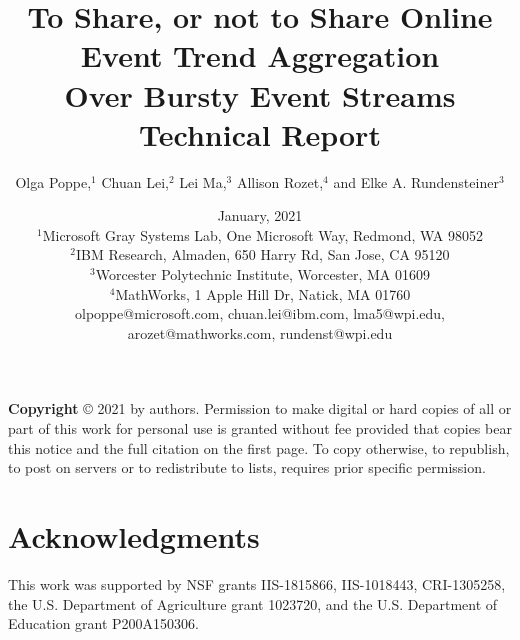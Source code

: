 \documentclass[twoside,10pt]{article} %
\title{\fontsize{15}{15}\selectfont To Share, or not to Share Online Event Trend Aggregation\\ Over Bursty Event Streams\\\vspace*{1cm}
\large Technical Report\\
\vspace*{1cm}}
\author{\large Olga Poppe,$^1$ Chuan Lei,$^2$ Lei Ma,$^3$ Allison Rozet,$^4$ and Elke A. Rundensteiner$^3$}
\date{\Large 
January, 2021\\
\vspace*{1cm}
\large $^1$Microsoft Gray Systems Lab, One Microsoft Way, Redmond, WA 98052\\
$^2$IBM Research, Almaden, 650 Harry Rd, San Jose, CA 95120\\
$^3$Worcester Polytechnic Institute, Worcester, MA 01609\\
$^4$MathWorks, 1 Apple Hill Dr, Natick, MA 01760\\
\vspace*{0.2cm}
olpoppe@microsoft.com, chuan.lei@ibm.com, lma5@wpi.edu, arozet@mathworks.com, rundenst@wpi.edu\\
\vspace*{7cm}
}
\begin{document}
\maketitle

\begin{spacing}{0.8}
{\footnotesize \noindent \textbf{Copyright} \copyright{} 2021 by
authors. Permission to make digital or hard copies of all or
part of this work for personal use is granted without fee provided
that copies bear this notice and the full citation on the first
page. To copy otherwise, to republish, to post on servers or to
redistribute to lists, requires prior specific permission. }
\end{spacing}

\clearpage
\pagestyle{fancy}

\clearpage
\tableofcontents

\setcounter{page}{1}

% 
%

\newpage











\section*{Acknowledgments} 
This work was supported by 
NSF grants IIS-1815866, IIS-1018443, CRI-1305258, 
the U.S. Department of Agriculture grant 1023720,
and the U.S. Department of Education grant P200A150306.



  


%
\end{document}
